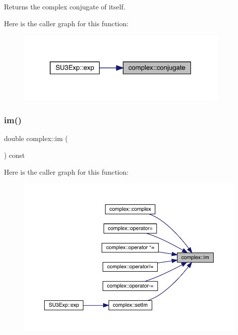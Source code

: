 \begin{DoxyReturn}{Returns}
the complex conjugate of itself. 
\end{DoxyReturn}
Here is the caller graph for this function\+:
\nopagebreak
\begin{figure}[H]
\begin{center}
\leavevmode
\includegraphics[width=293pt]{classcomplex_af21a3dae4577a3aab8e1105a1b919b81_icgraph}
\end{center}
\end{figure}
\mbox{\label{classcomplex_a450461dea92da7f72b96402edafd07c2}} 
\subsubsection{\texorpdfstring{im()}{im()}}
{\footnotesize\ttfamily double complex\+::im (\begin{DoxyParamCaption}{ }\end{DoxyParamCaption}) const\hspace{0.3cm}{\ttfamily [inline]}}

Here is the caller graph for this function\+:
\nopagebreak
\begin{figure}[H]
\begin{center}
\leavevmode
\includegraphics[width=350pt]{classcomplex_a450461dea92da7f72b96402edafd07c2_icgraph}
\end{center}
\end{figure}
\mbox{\label{classcomplex_a81dd00af9a4f56a86bd242b31cb1f8a4}} 
